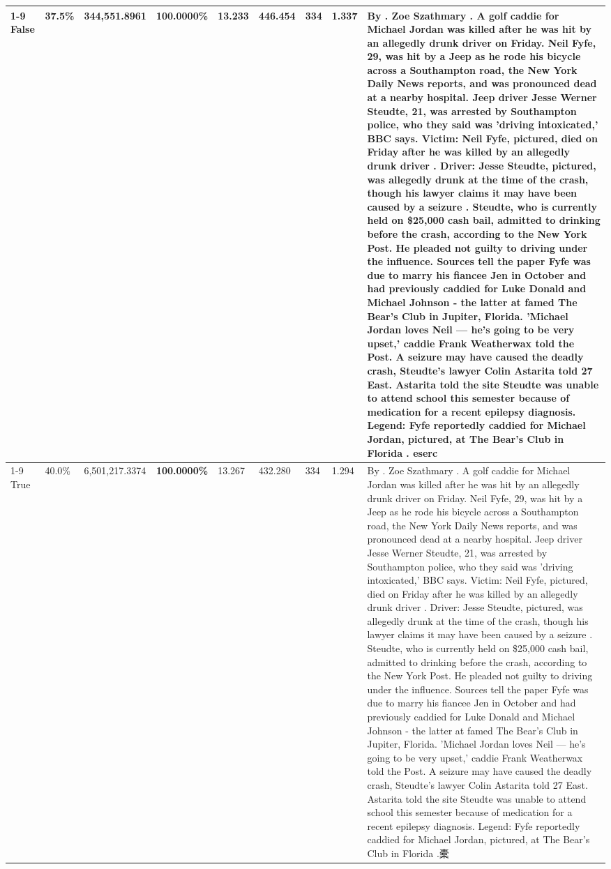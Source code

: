 \begin{table}[H]
\begin{tabular}{lllrlllll}
\cline{1-9}
False & 37.5\% & 344,551.8961 & \bfseries \color{red} 100.0000\% & 13.233 & 446.454 & 334 & 1.337 & By . Zoe Szathmary . A golf caddie for Michael Jordan was killed after he was hit by an allegedly drunk driver on Friday. Neil Fyfe, 29, was hit by a Jeep as he rode his bicycle across a Southampton road, the New York Daily News reports, and was pronounced dead at a nearby hospital. Jeep driver Jesse Werner Steudte, 21, was arrested by Southampton police, who they said was 'driving intoxicated,' BBC says. Victim: Neil Fyfe, pictured, died on Friday after he was killed by an allegedly drunk driver . Driver: Jesse Steudte, pictured, was allegedly drunk at the time of the crash, though his lawyer claims it may have been caused by a seizure . Steudte, who is currently held on \$25,000 cash bail, admitted to drinking before the crash, according to the New York Post. He pleaded not guilty to driving under the influence. Sources tell the paper Fyfe was due to marry his fiancee Jen in October and had previously caddied for Luke Donald and Michael Johnson - the latter at famed The Bear's Club in Jupiter, Florida. 'Michael Jordan loves Neil — he’s going to be very upset,' caddie Frank Weatherwax told the Post. A seizure may have caused the deadly crash, Steudte's lawyer Colin Astarita told 27 East. Astarita told the site Steudte was unable to attend school this semester because of medication for a recent epilepsy diagnosis. Legend: Fyfe reportedly caddied for Michael Jordan, pictured, at The Bear's Club in Florida . eserc \\
\cline{1-9}
True & 40.0\% & 6,501,217.3374 & \bfseries \color{red} 100.0000\% & 13.267 & 432.280 & 334 & 1.294 & By . Zoe Szathmary . A golf caddie for Michael Jordan was killed after he was hit by an allegedly drunk driver on Friday. Neil Fyfe, 29, was hit by a Jeep as he rode his bicycle across a Southampton road, the New York Daily News reports, and was pronounced dead at a nearby hospital. Jeep driver Jesse Werner Steudte, 21, was arrested by Southampton police, who they said was 'driving intoxicated,' BBC says. Victim: Neil Fyfe, pictured, died on Friday after he was killed by an allegedly drunk driver . Driver: Jesse Steudte, pictured, was allegedly drunk at the time of the crash, though his lawyer claims it may have been caused by a seizure . Steudte, who is currently held on \$25,000 cash bail, admitted to drinking before the crash, according to the New York Post. He pleaded not guilty to driving under the influence. Sources tell the paper Fyfe was due to marry his fiancee Jen in October and had previously caddied for Luke Donald and Michael Johnson - the latter at famed The Bear's Club in Jupiter, Florida. 'Michael Jordan loves Neil — he’s going to be very upset,' caddie Frank Weatherwax told the Post. A seizure may have caused the deadly crash, Steudte's lawyer Colin Astarita told 27 East. Astarita told the site Steudte was unable to attend school this semester because of medication for a recent epilepsy diagnosis. Legend: Fyfe reportedly caddied for Michael Jordan, pictured, at The Bear's Club in Florida .橐 \\

\end{tabular}
\end{table}
